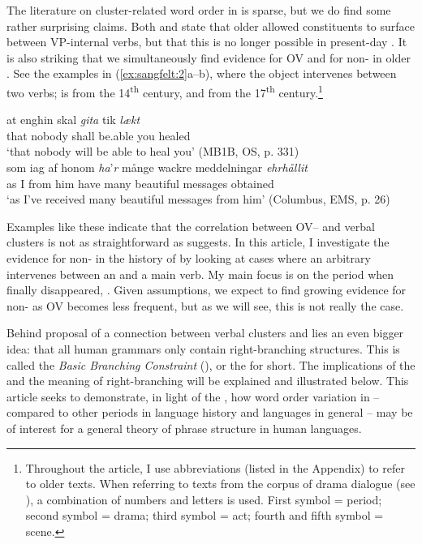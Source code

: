 \documentclass[output=paper, colorlinks, citecolor=brown]{langscibook}
\begin{document}
The literature on cluster-related word order in  is sparse, but we do find some rather surprising claims. Both \citet[171–172]{Falk1993} and \citet[157]{Petzell2011} state that older  allowed constituents to surface between VP-internal verbs, but that this is no longer possible in present-day . It is also striking that we simultaneously find evidence for OV and for non- in older . See the examples in (\ref{ex:sangfelt:2}a–b), where the object intervenes between two verbs;  is from the 14\textsuperscript{th} century, and  from the 17\textsuperscript{th} century.\footnote{Throughout the article, I use abbreviations (listed in the Appendix) to refer to older  texts. When referring to texts from the corpus of  drama dialogue (see ), a combination of numbers and letters is used. First symbol = period; second symbol = drama; third symbol = act; fourth and fifth symbol = scene.}


\ea
\label{ex:sangfelt:2}
\ea\label{ex:sangfelt:2a}
\gll at enghin skal \textit{gita} {tik} \textit{lækt} \\
that nobody shall be.able you healed\\
\glt ‘that nobody will be able to heal you’ (MB1B, OS, p. 331)\\

\ex \label{ex:sangfelt:2b}
\gll som iag af honom \textit{ha}’\textit{r} {månge} {wackre} {meddelningar} \textit{ehrhållit}\\
 as I from him have many beautiful messages obtained \\
\glt ‘as I’ve received many beautiful messages from him’ (Columbus, EMS, p. 26)\\
\z
\z


Examples like these indicate that the correlation between OV– and verbal clusters is not as straightforward as \citet{Haider2010} suggests. In this article, I investigate the evidence for non- in the history of  by looking at cases where an arbitrary  intervenes between an  and a main verb. My main focus is on the period when  finally disappeared, . Given  assumptions, we expect to find growing evidence for non- as OV becomes less frequent, but as we will see, this is not really the case.


Behind  proposal of a connection between verbal clusters and  lies an even bigger idea: that all human grammars only contain right-branching structures. This is called the \textit{Basic Branching Constraint} (\citealt{Haider2010, Haider2013}), or the  for short. The implications of the  and the meaning of right-branching will be explained and illustrated below. This article seeks to demonstrate, in light of the , how  word order variation in  – compared to other periods in  language history and  languages in general – may be of interest for a general theory of phrase structure in human languages.
\end{document}
